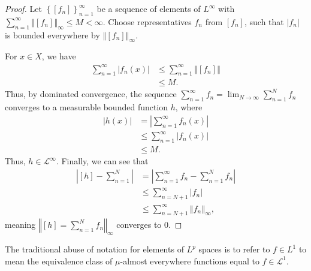 \documentclass[12pt]{extarticle}
\newcommand{\norm}[1]{\left\Vert #1\right\Vert}
\newcommand{\set}[1]{\left\{#1\right\}}
\theoremstyle{plain}
\theoremstyle{definition}
\theoremstyle{note}
\renewcommand{\newline}{\hfill\break}
\begin{document}
\begin{proof}
  Let $\set{[f_n]}_{n=1}^{\infty}$ be a sequence of elements of $L^{\infty}$ with $\sum_{n=1}^{\infty}\norm{[f_n]}_{\infty}\leq M < \infty$. Choose representatives $f_n$ from $[f_n]$, such that $\left\vert f_n \right\vert$ is bounded everywhere by $\norm{[f_n]}_{\infty}$.\newline

  For $x\in X$, we have
  \begin{align*}
    \sum_{n=1}^{\infty}\left\vert f_n(x) \right\vert &\leq \sum_{n=1}^{\infty}\norm{[f_n]}\\
                                                     &\leq M.
  \end{align*}
  Thus, by dominated convergence, the sequence $\sum_{n=1}^{\infty}f_n = \lim_{N\rightarrow\infty}\sum_{n=1}^{N}f_n$ converges to a measurable bounded function $h$, where
  \begin{align*}
    \left\vert h(x) \right\vert &= \left\vert \sum_{n=1}^{\infty}f_n(x) \right\vert\\
                                &\leq \sum_{n=1}^{\infty}\left\vert f_n(x) \right\vert\\
                                &\leq M.
  \end{align*}
  Thus, $h\in \mathcal{L}^{\infty}$. Finally, we can see that
  \begin{align*}
    \left\vert [h] - \sum_{n=1}^{N} \right\vert &= \left\vert \sum_{n=1}^{\infty}f_n - \sum_{n=1}^{N} f_n \right\vert\\
                                                &\leq \sum_{n=N + 1}^{\infty}\left\vert f_n\right\vert\\
                                                &\leq \sum_{n=N+1}^{\infty}\norm{f_n}_{\infty},
  \end{align*}
  meaning $\norm{[h] = \sum_{n=1}^{N}f_n}_{\infty}$ converges to $0$.
\end{proof}
The traditional abuse of notation for elements of $L^{p}$ spaces is to refer to $f\in L^{1}$ to mean the equivalence class of $\mu$-almost everywhere functions equal to $f\in \mathcal{L}^{1}$.\newline
\end{document}
